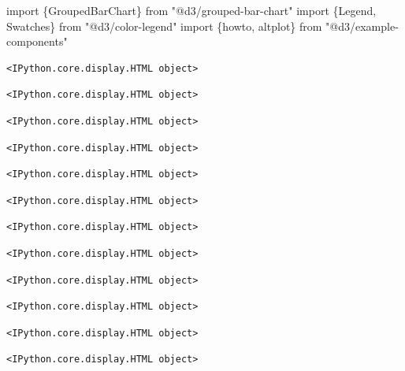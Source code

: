 \documentclass[
  letterpaper,
  DIV=11,
  numbers=noendperiod]{scrreprt}
\newenvironment{Shaded}{\begin{snugshade}}{\end{snugshade}}
\newcommand{\NormalTok}[1]{\textcolor[rgb]{0.00,0.23,0.31}{#1}}
\begin{document}
\begin{Shaded}
\begin{Highlighting}[]
\NormalTok{import \{GroupedBarChart\} from "@d3/grouped{-}bar{-}chart"}
\NormalTok{import \{Legend, Swatches\} from "@d3/color{-}legend"}
\NormalTok{import \{howto, altplot\} from "@d3/example{-}components"}
\end{Highlighting}
\end{Shaded}

\begin{verbatim}
<IPython.core.display.HTML object>
\end{verbatim}

\begin{verbatim}
<IPython.core.display.HTML object>
\end{verbatim}

\begin{verbatim}
<IPython.core.display.HTML object>
\end{verbatim}

\begin{verbatim}
<IPython.core.display.HTML object>
\end{verbatim}

\begin{verbatim}
<IPython.core.display.HTML object>
\end{verbatim}

\begin{verbatim}
<IPython.core.display.HTML object>
\end{verbatim}

\begin{verbatim}
<IPython.core.display.HTML object>
\end{verbatim}

\begin{verbatim}
<IPython.core.display.HTML object>
\end{verbatim}

\begin{verbatim}
<IPython.core.display.HTML object>
\end{verbatim}

\begin{verbatim}
<IPython.core.display.HTML object>
\end{verbatim}

\begin{verbatim}
<IPython.core.display.HTML object>
\end{verbatim}

\begin{verbatim}
<IPython.core.display.HTML object>
\end{verbatim}
\end{document}
